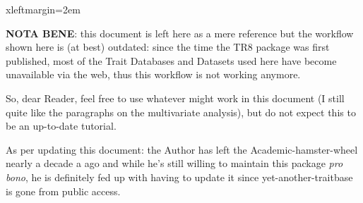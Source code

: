 
\maketitle
{}
 {xleftmargin=2em}
\renewenvironment{Schunk}{\vspace{\topsep}}{\vspace{\topsep}}


\textbf{NOTA BENE}: this document is left here as a mere
reference but the workflow shown here is (at best) outdated: since
the time the TR8 package was first published,
most of the Trait Databases and Datasets used here have become
unavailable via the web, thus this workflow is not working anymore.

So, dear Reader, feel free to use whatever might work in this
document (I still quite like the paragraphs on the multivariate
analysis), but do not expect this to be an up-to-date tutorial.

As per updating this document: the Author has left the
Academic-hamster-wheel nearly a decade a ago and while he's still
willing to maintain this package \textit{pro bono}, he is
definitely fed up with having to update it since yet-another-traitbase
is gone from public access.





